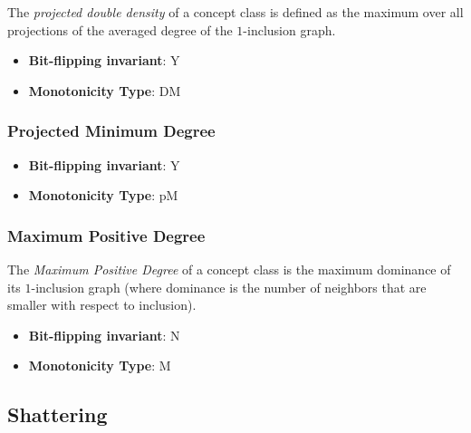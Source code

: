       \begin{definition}\label{def:projected_double_density_or_projected_average_degree}
      The \emph{projected double density} of a concept class is defined as the maximum over all projections of the averaged degree of the $1$-inclusion graph.
      \end{definition}
      \begin{itemize}
      \item {\bf Bit-flipping invariant}: Y
      \item {\bf Monotonicity Type}: DM
      \end{itemize}
\subsubsection{Projected Minimum Degree}
      
      \begin{definition}\label{def:projected_minimum_degree}
      
      \end{definition}
      \begin{itemize}
      \item {\bf Bit-flipping invariant}: Y
      \item {\bf Monotonicity Type}: pM
      \end{itemize}
\subsubsection{Maximum Positive Degree}
      
      \begin{definition}\label{def:maximum_positive_degree}
      The \emph{Maximum Positive Degree} of a concept class is the maximum dominance of its $1$-inclusion graph (where dominance is the number of neighbors that are smaller with respect to inclusion).
      \end{definition}
      \begin{itemize}
      \item {\bf Bit-flipping invariant}: N
      \item {\bf Monotonicity Type}: M
      \end{itemize}
\subsection{Shattering}\label{sec:Shattering}
